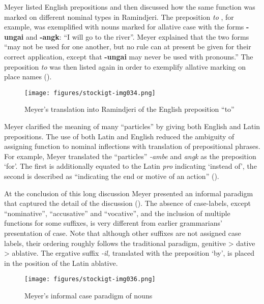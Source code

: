 \hspace*{-4.4pt}Meyer listed English prepositions and then discussed how the same function was marked on different nominal types in Ramindjeri. The preposition \textit{to} \citep[13]{meyer_vocabulary_1843}, for example, was exemplified with nouns marked for allative case with the forms \textbf{-ungai} and \textbf{-angk}: “I will go to the river”. Meyer explained that the two forms “may not be used for one another, but no rule can at present be given for their correct application, except that \textbf{-ungai} may never be used with pronouns.” The preposition \textit{to} was then listed again in order to exemplify allative marking on place names ().

\begin{figure}
\texttt{[image: figures/stockigt-img034.png]}
\caption{Meyer’s translation into Ramindjeri of the English preposition “to”  \citeyearpar[13]{meyer_vocabulary_1843}}
\label{fig:key:94}
\end{figure}

\hspace*{-4.4pt}Meyer clarified the meaning of many “particles” by giving both English and Latin prepositions. The use of both Latin and English reduced the ambiguity of assigning function to nominal inflections with translation of prepositional phrases. For example, Meyer translated the “particles” \textit{-ambe} and \textit{angk} as the preposition `for'. The first is additionally equated to the Latin \textit{pro} indicating `instead of', the second is described as “indicating the end or motive of an action” (\citeyear[17]{meyer_vocabulary_1843}).

\hspace*{-4.4pt}At the conclusion of this long discussion Meyer presented an informal paradigm that captured the detail of the discussion (). The absence of case-labels, except ``nominative'', ``accusative'' and ``vocative'', and the inclusion of multiple functions for some suffixes, is very different from earlier grammarians' presentation of case. Note that although other suffixes are not assigned case labels, their ordering roughly follows the traditional paradigm, genitive > dative > ablative. The ergative suffix \textit{-il,} translated with the preposition `by', is placed in the position of the Latin ablative.

\begin{figure}
\texttt{[image: figures/stockigt-img036.png]}
\caption{Meyer’s informal case paradigm of nouns  \citeyearpar[17–18]{meyer_vocabulary_1843}}
\label{fig:key:95}
\end{figure}

